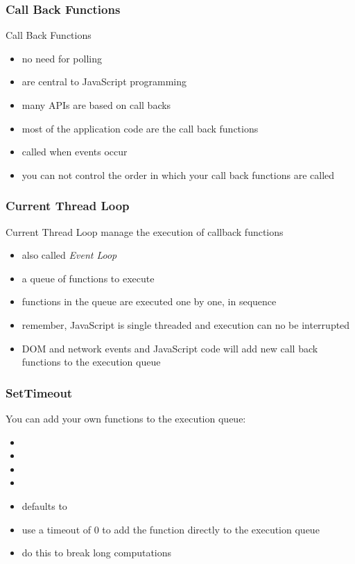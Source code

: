 \begin{frame}[fragile] \frametitle{Call Back Functions}
Call Back Functions
\begin{itemize}
  \item no need for polling
  \item are central to JavaScript programming
  \item many APIs are based on call backs
  \item most of the application code are the call back functions
  \item called when events occur
  \item you can not control the order in which your call back functions are called
\end{itemize}
\end{frame}

\begin{frame}[fragile] \frametitle{Current Thread Loop}
Current Thread Loop manage the execution of callback functions
\begin{itemize}
  \item also called \emph{Event Loop}
  \item a queue of functions to execute
  \item functions in the queue are executed one by one, in sequence
  \item remember, JavaScript is single threaded and execution can no be interrupted
  \item DOM and network events and JavaScript code will add new call back functions to the execution queue
\end{itemize}
\end{frame}

\begin{frame}[fragile] \frametitle{SetTimeout}
You can add your own functions to the execution queue:
\begin{itemize}
  \item {}
  \item {}
  \item {}
  \item {}
  \item {} defaults to 
  \item use a timeout of 0 to add the function directly to the execution queue
  \item do this to break long computations
\end{itemize}
\end{frame}

